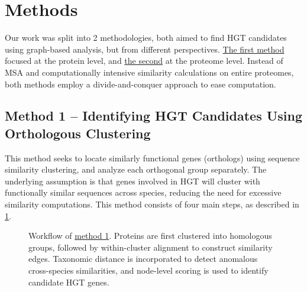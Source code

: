 \documentclass[11pt]{article}
\begin{document}
	\section{Methods}
	Our work was split into 2 methodologies, both aimed to find HGT candidates using graph-based analysis, but from different perspectives. \hyperref[subsec:method1]{The first method} focused at the protein level, and \hyperref[subsec:method2]{the second} at the proteome level. Instead of MSA and computationally intensive similarity calculations on entire proteomes, both methods employ a divide-and-conquer approach to ease computation.
	
	\subsection{Method 1 -- Identifying HGT Candidates Using Orthologous Clustering}
	\label{subsec:method1}
	This method seeks to locate similarly functional genes (orthologs) using sequence similarity clustering, and analyze each orthogonal group separately.
	The underlying assumption is that genes involved in HGT will cluster with functionally similar sequences across species, reducing the need for excessive similarity computations. This method consists of four main steps, as described in \cref{fig:method1-workflow}.
	\begin{figure}[htbp]
		\centering
		
		\caption{Workflow of \hyperref[subsec:method1]{method 1}. Proteins are first clustered into homologous groups, followed by within-cluster alignment to construct similarity edges. Taxonomic distance is incorporated to detect anomalous cross-species similarities, and node-level scoring is used to identify candidate HGT genes.}
		\label{fig:method1-workflow}
	\end{figure}
	
\end{document}
